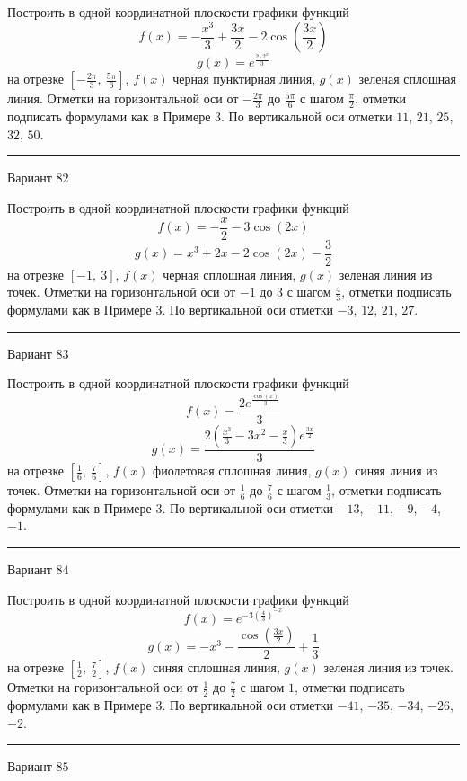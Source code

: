 \documentclass[11pt]{report}
\begin{document}
Построить в одной координатной плоскости графики функций $$f(x) = - \frac{x^{3}}{3} + \frac{3 x}{2} - 2 \cos{\left(\frac{3 x}{2} \right)}$$ $$g(x) = e^{\frac{2 \cdot 2^{x}}{3}}$$ на отрезке $\left[- \frac{2 \pi}{3}, \  \frac{5 \pi}{6}\right]$, $f(x)$ черная пунктирная линия, $g(x)$ зеленая сплошная линия. Отметки на горизонтальной оси от $- \frac{2 \pi}{3}$ до $\frac{5 \pi}{6}$ с шагом $\frac{\pi}{2}$, отметки подписать формулами как в Примере 3. По вертикальной оси отметки $11$, $21$, $25$, $32$, $50$.
\begin{center}
\noindent\rule{8cm}{0.4pt}
\end{center}
Вариант $82$


Построить в одной координатной плоскости графики функций $$f(x) = - \frac{x}{2} - 3 \cos{\left(2 x \right)}$$ $$g(x) = x^{3} + 2 x - 2 \cos{\left(2 x \right)} - \frac{3}{2}$$ на отрезке $\left[-1, \  3\right]$, $f(x)$ черная сплошная линия, $g(x)$ зеленая линия из точек. Отметки на горизонтальной оси от $-1$ до $3$ с шагом $\frac{4}{3}$, отметки подписать формулами как в Примере 3. По вертикальной оси отметки $-3$, $12$, $21$, $27$.
\begin{center}
\noindent\rule{8cm}{0.4pt}
\end{center}
Вариант $83$


Построить в одной координатной плоскости графики функций $$f(x) = \frac{2 e^{\frac{\cos{\left(x \right)}}{3}}}{3}$$ $$g(x) = \frac{2 \left(\frac{x^{3}}{3} - 3 x^{2} - \frac{x}{3}\right) e^{\frac{3 x}{2}}}{3}$$ на отрезке $\left[\frac{1}{6}, \  \frac{7}{6}\right]$, $f(x)$ фиолетовая сплошная линия, $g(x)$ синяя линия из точек. Отметки на горизонтальной оси от $\frac{1}{6}$ до $\frac{7}{6}$ с шагом $\frac{1}{3}$, отметки подписать формулами как в Примере 3. По вертикальной оси отметки $-13$, $-11$, $-9$, $-4$, $-1$.
\begin{center}
\noindent\rule{8cm}{0.4pt}
\end{center}
Вариант $84$


Построить в одной координатной плоскости графики функций $$f(x) = e^{- 3 \left(\frac{4}{3}\right)^{- x}}$$ $$g(x) = - x^{3} - \frac{\cos{\left(\frac{3 x}{2} \right)}}{2} + \frac{1}{3}$$ на отрезке $\left[\frac{1}{2}, \  \frac{7}{2}\right]$, $f(x)$ синяя сплошная линия, $g(x)$ зеленая линия из точек. Отметки на горизонтальной оси от $\frac{1}{2}$ до $\frac{7}{2}$ с шагом $1$, отметки подписать формулами как в Примере 3. По вертикальной оси отметки $-41$, $-35$, $-34$, $-26$, $-2$.
\begin{center}
\noindent\rule{8cm}{0.4pt}
\end{center}
Вариант $85$
\end{document}
